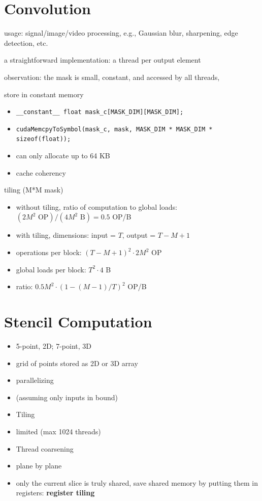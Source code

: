 \documentclass{article}
\begin{document}
\newpage
\section{Convolution}

usage: signal/image/video processing, e.g., Gaussian blur, sharpening, edge detection, etc.


a straightforward implementation: a thread per output element


observation: the mask is small, constant, and accessed by all threads,

store in constant memory

\begin{itemize}
\item \texttt{\_\_constant\_\_ float mask\_c[MASK\_DIM][MASK\_DIM];}
\item \texttt{cudaMemcpyToSymbol(mask\_c, mask, MASK\_DIM * MASK\_DIM * sizeof(float));}
\item can only allocate up to 64 KB
\item cache coherency

\end{itemize}
tiling (M*M mask)

\begin{itemize}
\item without tiling, ratio of computation to global loads: $(2M^2 \text{ OP}) / (4M^2 \text{ B}) = 0.5$ OP/B
\item with tiling, dimensions: input = $T$, output = $T-M+1$
\item operations per block: $(T-M+1)^2 \cdot 2M^2$ OP
\item global loads per block: $T^2 \cdot 4$ B
\item ratio: $0.5M^2 \cdot (1 - (M-1)/T)^2$ OP/B

\end{itemize}

\newpage
\section{Stencil Computation}

\begin{itemize}
\item 5-point, 2D; 7-point, 3D
\item grid of points stored as 2D or 3D array
\item parallelizing
\item (assuming only inputs in bound)
\item Tiling
\item limited (max 1024 threads)
\item Thread coarsening
\item plane by plane
\item only the current slice is truly shared, save shared memory by putting them in registers: \textbf{register tiling}



\end{itemize}
\end{document}
